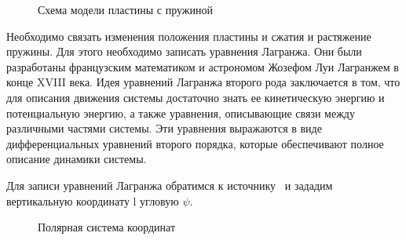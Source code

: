 \documentclass[a4paper,14pt]{extarticle}
\begin{document}
\begin{figure}[!htbp]
	\caption{Схема модели пластины с пружиной}
	\label{pruzina}
\end{figure}


Необходимо связать изменения положения пластины и сжатия и растяжение пружины. Для этого необходимо записать уравнения Лагранжа. Они были разработаны французским математиком и астрономом Жозефом Луи Лагранжем в конце XVIII века. Идея уравнений Лагранжа второго рода заключается в том, что для описания движения системы достаточно знать ее кинетическую энергию и потенциальную энергию, а также уравнения, описывающие связи между различными частями системы. Эти уравнения выражаются в виде дифференциальных уравнений второго порядка, которые обеспечивают полное описание динамики системы.

Для записи уравнений Лагранжа обратимся к источнику~\cite{itmo} и зададим вертикальную координату l угловую $\psi$.
\begin{figure}[!htbp]
	\caption{Полярная система координат}
	\label{Polar_coordinate_components}
\end{figure}
\end{document}
